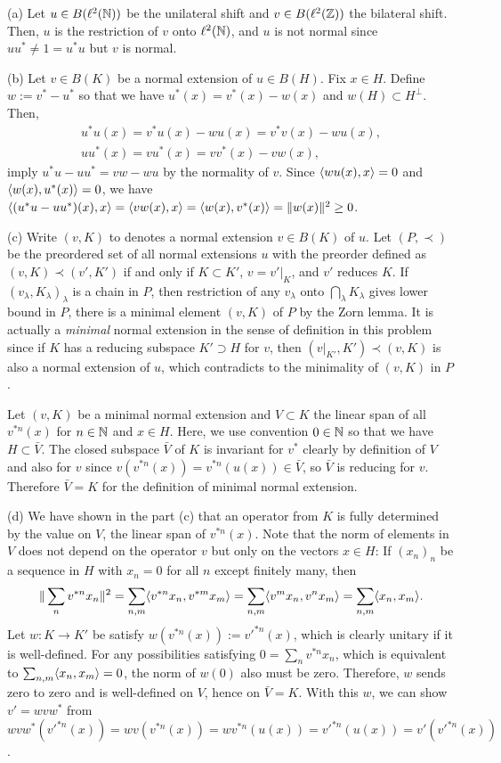 \documentclass{article}
\begin{document}
\begin{sol}
(a)
Let $u\in B(\ell^2(\mathbb{N}))$ be the unilateral shift and $v\in B(\ell^2(\mathbb{Z}))$ the bilateral shift.
Then, $u$ is the restriction of $v$ onto $\ell^2(\mathbb{N})$, and $u$ is not normal since $uu^*\ne1=u^*u$ but $v$ is normal.

(b)
Let $v\in B(K)$ be a normal extension of $u\in B(H)$.
Fix $x\in H$.
Define $w:=v^*-u^*$ so that we have $u^*(x)=v^*(x)-w(x)$ and $w(H)\subset H^\perp$.
Then,
\begin{gather*}
u^*u(x)=v^*u(x)-wu(x)=v^*v(x)-wu(x),\\
uu^*(x)=vu^*(x)=vv^*(x)-vw(x),
\end{gather*}
imply $u^*u-uu^*=vw-wu$ by the normality of $v$.
Since $\langle wu(x),x\rangle=0$ and $\langle w(x),u^*(x)\rangle=0$, we have $\langle(u^*u-uu^*)(x),x\rangle=\langle vw(x),x\rangle=\langle w(x),v^*(x)\rangle=\|w(x)\|^2\ge0$.

(c)
Write $(v,K)$ to denotes a normal extension $v\in B(K)$ of $u$.
Let $(P,\prec)$ be the preordered set of all normal extensions $u$ with the preorder defined as $(v,K)\prec(v',K')$ if and only if $K\subset K'$, $v=v'|_K$, and $v'$ reduces $K$.
If $(v_\lambda,K_\lambda)_\lambda$ is a chain in $P$, then restriction of any $v_\lambda$ onto $\bigcap_\lambda K_\lambda$ gives lower bound in $P$, there is a minimal element $(v,K)$ of $P$ by the Zorn lemma.
It is actually a \emph{minimal} normal extension in the sense of definition in this problem since if $K$ has a reducing subspace $K'\supset H$ for $v$, then $(v|_{K'},K')\prec(v,K)$ is also a normal extension of $u$, which contradicts to the minimality of $(v,K)$ in $P$.

Let $(v,K)$ be a minimal normal extension and $V\subset K$ the linear span of all $v^{*n}(x)$ for $n\in\mathbb{N}$ and $x\in H$.
Here, we use convention $0\in\mathbb{N}$ so that we have $H\subset\bar V$.
The closed subspace $\bar V$ of $K$ is invariant for $v^*$ clearly by definition of $V$ and also for $v$ since $v(v^{*n}(x))=v^{*n}(u(x))\in \bar V$, so $\bar V$ is reducing for $v$.
Therefore $\bar V=K$ for the definition of minimal normal extension.

(d)
We have shown in the part (c) that an operator from $K$ is fully determined by the value on $V$, the linear span of $v^{*n}(x)$.
Note that the norm of elements in $V$ does not depend on the operator $v$ but only on the vectors $x\in H$:
If $(x_n)_n$ be a sequence in $H$ with $x_n=0$ for all $n$ except finitely many, then
\[\|\sum_n v^{*n}x_n\|^2
=\sum_{n,m}\langle v^{*n}x_n,v^{*m}x_m\rangle
=\sum_{n,m}\langle v^mx_n,v^nx_m\rangle
=\sum_{n,m}\langle x_n,x_m\rangle.\]
Let $w:K\to K'$ be satisfy $w(v^{*n}(x)):=v'^{*n}(x)$, which is clearly unitary if it is well-defined.
For any possibilities satisfying $0=\sum_nv^{*n}x_n$, which is equivalent to $\sum_{n,m}\langle x_n,x_m\rangle=0$, the norm of $w(0)$ also must be zero.
Therefore, $w$ sends zero to zero and is well-defined on $V$, hence on $\bar V=K$.
With this $w$, we can show $v'=wvw^*$ from $wvw^*(v'^{*n}(x))=wv(v^{*n}(x))=wv^{*n}(u(x))=v'^{*n}(u(x))=v'(v'^{*n}(x))$.
\end{sol}
\end{document}
